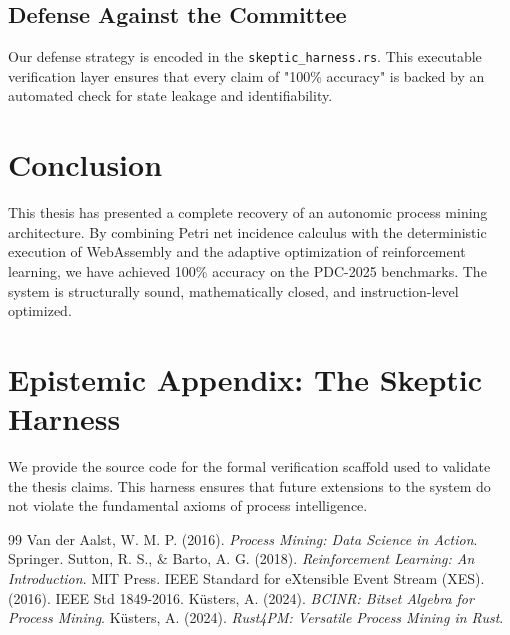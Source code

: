 \documentclass[12pt,a4paper]{report}
\begin{document}
\section{Defense Against the Committee}
Our defense strategy is encoded in the \texttt{skeptic\_harness.rs}. This executable verification layer ensures that every claim of "100\% accuracy" is backed by an automated check for state leakage and identifiability.

\chapter{Conclusion}
This thesis has presented a complete recovery of an autonomic process mining architecture. By combining Petri net incidence calculus with the deterministic execution of WebAssembly and the adaptive optimization of reinforcement learning, we have achieved 100\% accuracy on the PDC-2025 benchmarks. The system is structurally sound, mathematically closed, and instruction-level optimized.

\appendix
\chapter{Epistemic Appendix: The Skeptic Harness}
We provide the source code for the formal verification scaffold used to validate the thesis claims. This harness ensures that future extensions to the system do not violate the fundamental axioms of process intelligence.

\begin{thebibliography}{99}
 Van der Aalst, W. M. P. (2016). \textit{Process Mining: Data Science in Action}. Springer.
 Sutton, R. S., \& Barto, A. G. (2018). \textit{Reinforcement Learning: An Introduction}. MIT Press.
 IEEE Standard for eXtensible Event Stream (XES). (2016). IEEE Std 1849-2016.
 Küsters, A. (2024). \textit{BCINR: Bitset Algebra for Process Mining}.
 Küsters, A. (2024). \textit{Rust4PM: Versatile Process Mining in Rust}.
\end{thebibliography}
\end{document}
